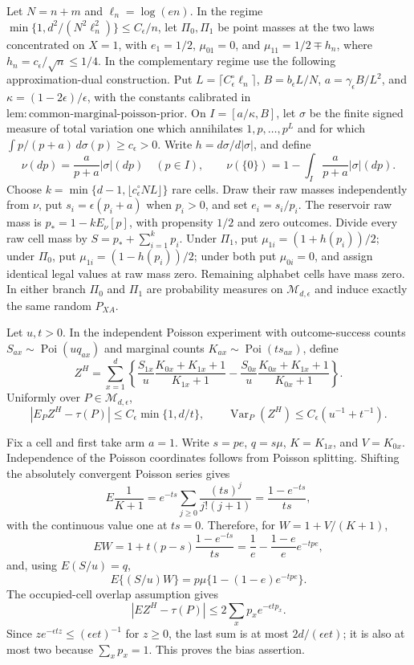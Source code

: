 Let \(N=n+m\) and \(\ell_n=\log(en)\).  In the regime \(\min\{1,d^2/(N^2\ell_n^2)\}\le C_\epsilon/n\), let \(\Pi_0,\Pi_1\) be point masses at the two laws concentrated on \(X=1\), with \(e_1=1/2\), \(\mu_{01}=0\), and \(\mu_{11}=1/2\mp h_n\), where \(h_n=c_\epsilon/\sqrt n\le1/4\).  In the complementary regime use the following approximation-dual construction.  Put \(L=\lceil C_\epsilon^\circ\ell_n\rceil\), \(B=b_\epsilon L/N\), \(a=\gamma_\epsilon B/L^2\), and \(\kappa=(1-2\epsilon)/\epsilon\), with the constants calibrated in \(\mathrm{lem:common\mbox{-}marginal\mbox{-}poisson\mbox{-}prior}\).  On \(I=[a/\kappa,B]\), let \(\sigma\) be the finite signed measure of total variation one which annihilates \(1,p,\ldots,p^L\) and for which \(\int p/(p+a)\,d\sigma(p)\ge c_\epsilon>0\).  Write \(h=d\sigma/d|\sigma|\), and define
\[
 \nu(dp)=\frac{a}{p+a}|\sigma|(dp)\quad(p\in I),
 \qquad
 \nu(\{0\})=1-\int_I\frac{a}{p+a}|\sigma|(dp).
\]
Choose \(k=\min\{d-1,\lfloor c_\epsilon^\circ NL\rfloor\}\) rare cells.  Draw their raw masses independently from \(\nu\), put \(s_i=\epsilon(p_i+a)\) when \(p_i>0\), and set \(e_i=s_i/p_i\).  The reservoir raw mass is \(p_*=1-kE_\nu[p]\), with propensity \(1/2\) and zero outcomes.  Divide every raw cell mass by \(S=p_*+\sum_{i=1}^kp_i\).  Under \(\Pi_1\), put \(\mu_{1i}=(1+h(p_i))/2\); under \(\Pi_0\), put \(\mu_{1i}=(1-h(p_i))/2\); under both put \(\mu_{0i}=0\), and assign identical legal values at raw mass zero.  Remaining alphabet cells have mass zero.  In either branch \(\Pi_0\) and \(\Pi_1\) are probability measures on \(\mathcal M_{d,\epsilon}\) and induce exactly the same random \(P_{XA}\).

Let \(u,t>0\).  In the independent Poisson experiment with outcome-success counts \(S_{ax}\sim\operatorname{Poi}(u q_{ax})\) and marginal counts \(K_{ax}\sim\operatorname{Poi}(t s_{ax})\), define
\[
 Z^H=\sum_{x=1}^d\left\{\frac{S_{1x}}u\frac{K_{0x}+K_{1x}+1}{K_{1x}+1}-
 \frac{S_{0x}}u\frac{K_{0x}+K_{1x}+1}{K_{0x}+1}\right\}.
\]
Uniformly over \(P\in\mathcal M_{d,\epsilon}\),
\[
 |E_PZ^H-\tau(P)|\le C_\epsilon\min\{1,d/t\},
 \qquad
 \operatorname{Var}_P(Z^H)\le C_\epsilon(u^{-1}+t^{-1}).
\]

Fix a cell and first take arm \(a=1\).  Write \(s=pe\), \(q=s\mu\), \(K=K_{1x}\), and \(V=K_{0x}\).  Independence of the Poisson coordinates follows from Poisson splitting.  Shifting the absolutely convergent Poisson series gives
\[
 E\frac1{K+1}=e^{-ts}\sum_{j\ge0}\frac{(ts)^j}{j!(j+1)}
 =\frac{1-e^{-ts}}{ts},
\]
with the continuous value one at \(ts=0\).  Therefore, for \(W=1+V/(K+1)\),
\[
 EW=1+t(p-s)\frac{1-e^{-ts}}{ts}
 =\frac1e-\frac{1-e}{e}e^{-tpe},
\]
and, using \(E(S/u)=q\),
\[
 E\{(S/u)W\}=p\mu\{1-(1-e)e^{-tpe}\}.
\]
The occupied-cell overlap assumption gives
\[
 |E Z^H-\tau(P)|
 \le2\sum_xp_xe^{-\epsilon t p_x}.
\]
Since \(z e^{-\epsilon tz}\le(\epsilon et)^{-1}\) for \(z\ge0\), the last sum is at most \(2d/(\epsilon et)\); it is also at most two because \(\sum_xp_x=1\).  This proves the bias assertion.

